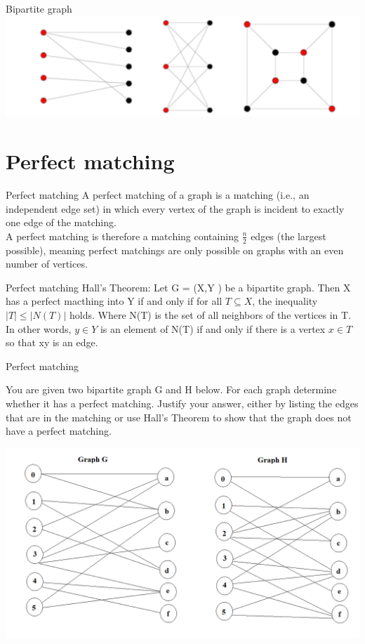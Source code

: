 \documentclass{beamer}
\theoremstyle{definition}
\begin{document}
\begin{frame}{Bipartite graph}
    \centering \includegraphics[width=.7\linewidth]{p5.PNG}
\end{frame}

\section{Perfect matching}

\begin{frame}{Perfect matching}
A perfect matching of a graph is a matching (i.e., an independent edge set) in which every vertex of the graph is incident to exactly one edge of the matching. 
\\A perfect matching is therefore a matching containing $\frac{n}{2}$ edges (the largest possible), meaning perfect matchings are only possible on graphs with an even number of vertices.
\end{frame}

\begin{frame}{Perfect matching}
 Hall’s Theorem: Let G = (X,Y ) be a bipartite graph. Then X has a perfect macthing into Y if and only if for all $T \subseteq X$, the inequality $|T| \leq |N(T)|$ holds. Where N(T) is the set of all neighbors of the vertices in T. In other words, $y \in  Y$ is an element of N(T) if and only if there is a vertex $x \in  T$ so that xy is an edge.
\end{frame}

\begin{frame}{Perfect matching}
    \begin{flushleft}
        You are given two bipartite graph G and H below. For each graph determine whether it has a perfect matching. Justify your answer, either by listing the edges that are in the matching or use Hall's Theorem to show that the graph does not have a perfect matching.
    \end{flushleft}
    \centering \includegraphics[width=.7\linewidth]{p6.jpg}
\end{frame}
\end{document}
